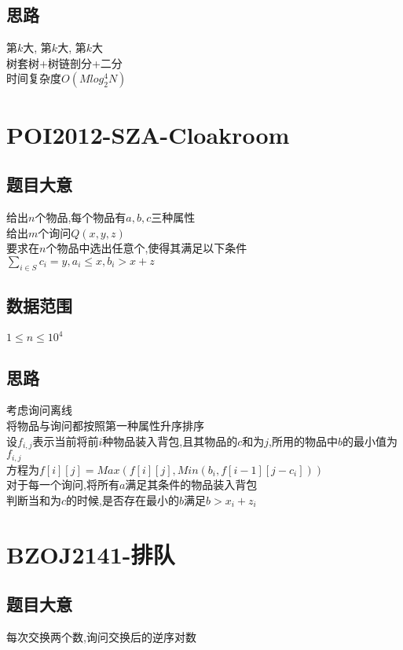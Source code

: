 \documentclass{ctexart}
\numberwithin{equation}{section}
\begin{document}
\begin{flushleft}
  \subsection{思路}
  第$k$大, 第$k$大, 第$k$大\\

  树套树+树链剖分+二分\\
  时间复杂度$O(Mlog_2^4N)$
  \newpage

  \section{POI2012-SZA-Cloakroom}
  \subsection{题目大意}
  给出$n$个物品,每个物品有$a,b,c$三种属性\\
  给出$m$个询问$Q(x,y,z)$\\
  要求在$n$个物品中选出任意个,使得其满足以下条件\\
  $\sum_{i\in S}c_i = y, a_i\leq x, b_i>x+z$\\
  \subsection{数据范围}
  $1\le n\le 10^4$
  \subsection{思路}
  考虑询问离线\\
  将物品与询问都按照第一种属性升序排序\\
  设$f_{i,j}$表示当前将前$i$种物品装入背包,且其物品的$c$和为$j$,所用的物品中$b$的最小值为$f_{i,j}$\\
  方程为$f[i][j] = Max(f[i][j], Min(b_i, f[i-1][j-c_i]))$\\
  对于每一个询问,将所有$a$满足其条件的物品装入背包\\
  判断当和为$c$的时候,是否存在最小的$b$满足$b>x_i+z_i$\\

  \newpage
  
  \section{BZOJ2141-排队}
  \subsection{题目大意}
  每次交换两个数,询问交换后的逆序对数\\

\end{flushleft}
\end{document}
